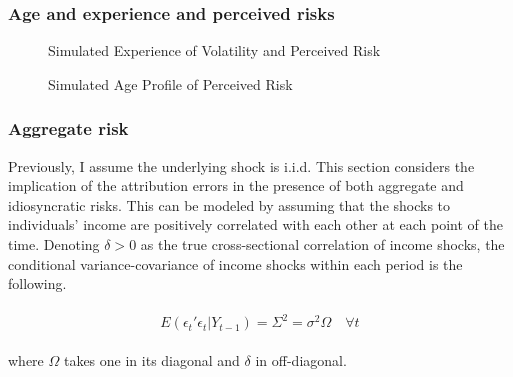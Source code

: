 \documentclass[12pt,notitlepage,onecolumn,aps,pra]{article}
\begin{document}
    \hypertarget{age-and-experience-and-perceived-risks}{%
\subsubsection{Age and experience and perceived
risks}\label{age-and-experience-and-perceived-risks}}


    \begin{figure*}[!ht]
        \begin{center}\end{center}
        \caption{Simulated Experience of Volatility and Perceived Risk}
        \label{fig:var_experience_var_sim}
    \end{figure*}
    

    \begin{figure*}[!ht]
        \begin{center}\end{center}
        \caption{Simulated Age Profile of Perceived Risk}
        \label{fig:var_age_sim}
    \end{figure*}
    
    \hypertarget{aggregate-risk}{%
\subsubsection{Aggregate risk}\label{aggregate-risk}}

Previously, I assume the underlying shock is i.i.d. This section
considers the implication of the attribution errors in the presence of
both aggregate and idiosyncratic risks. This can be modeled by assuming
that the shocks to individuals' income are positively correlated with
each other at each point of the time. Denoting \(\delta>0\) as the true
cross-sectional correlation of income shocks, the conditional
variance-covariance of income shocks within each period is the
following.

\begin{eqnarray}
\begin{split}
E(\epsilon_{t}'\epsilon_{t}|Y_{t-1}) = \Sigma^2 = \sigma^2\Omega \quad \forall t  
\end{split}
\end{eqnarray}

where \(\Omega\) takes one in its diagonal and \(\delta\) in
off-diagonal.
\end{document}

